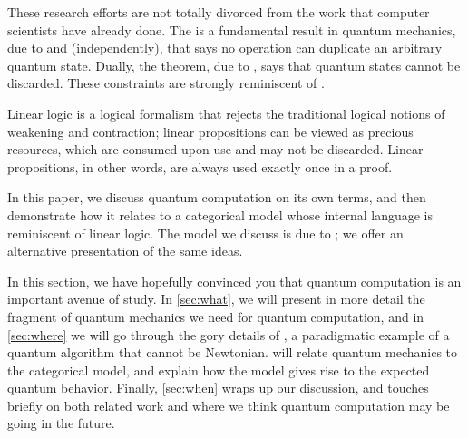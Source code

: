 These research efforts are not totally divorced from the work that computer
scientists have already done.  The  is a fundamental
result in quantum mechanics, due to \cite{wooters1982single} and
\cite{dieks1982communication} (independently), that says no operation can
duplicate an arbitrary quantum state.  Dually, the  theorem,
due to , says that quantum states cannot be discarded.  These
constraints are strongly reminiscent of .

Linear logic is a logical formalism that rejects the traditional logical
notions of weakening and contraction; linear propositions can be viewed as
precious resources, which are consumed upon use and may not be discarded.
Linear propositions, in other words, are always used exactly once in a proof.

In this paper, we discuss quantum computation on its own terms, and then
demonstrate how it relates to a categorical model whose internal language is
reminiscent of linear logic.  The model we discuss is due to \cite{abramsky2009categorical};
we offer an alternative presentation of the same ideas.

In this section, we have hopefully convinced you that quantum computation is an
important avenue of study.  In \cref{sec:what}, we will present in more detail
the fragment of quantum mechanics we need for quantum computation, and in
\cref{sec:where} we will go through the gory details of , a paradigmatic example of a quantum algorithm that cannot be
Newtonian.   will relate quantum mechanics to the categorical model,
and explain how the model gives rise to the expected quantum behavior.  Finally,
\cref{sec:when} wraps up our discussion, and touches briefly on both related
work and where we think quantum computation may be going in the future.
